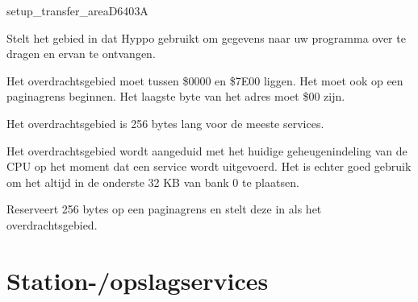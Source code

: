 %
\newpage
\begin{hyppotrap}{setup\_transfer\_area}{D640}{3A}

\item [Dienst:]  Stelt het gebied in dat Hyppo gebruikt om gegevens naar uw programma over te dragen en ervan te ontvangen.

\item [Invoer:]

\item [Foutcodes:]

\item [Geschiedenis:]
\item [Opmerkingen:]  Het overdrachtsgebied moet tussen \$0000 en \$7E00 liggen. Het moet ook op een paginagrens beginnen. Het laagste byte van het adres moet \$00 zijn.

  Het overdrachtsgebied is 256 bytes lang voor de meeste services.

  Het overdrachtsgebied wordt aangeduid met het huidige geheugenindeling van de CPU op het moment dat een service wordt uitgevoerd. Het is echter goed gebruik om het altijd in de onderste 32 KB van bank 0 te plaatsen.
\item [Voorbeeld:]  Reserveert 256 bytes op een paginagrens en stelt deze in als het overdrachtsgebied.
\end{hyppotrap}



\newpage
\section{Station-/opslagservices}


